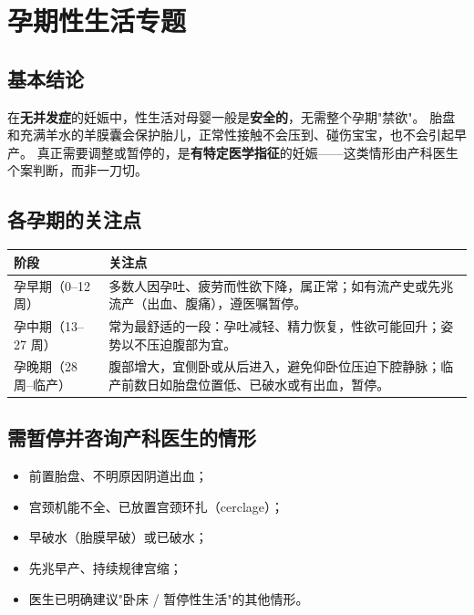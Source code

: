 
\chapter{孕期性生活专题}

\section{基本结论}
在\textbf{无并发症}的妊娠中，性生活对母婴一般是\textbf{安全的}，无需整个孕期"禁欲"。
胎盘和充满羊水的羊膜囊会保护胎儿，正常性接触不会压到、碰伤宝宝，也不会引起早产。
真正需要调整或暂停的，是\textbf{有特定医学指征}的妊娠——这类情形由产科医生个案判断，而非一刀切。

\section{各孕期的关注点}
\begin{tabularx}{\textwidth}{l X}
\toprule
\textbf{阶段} & \textbf{关注点} \\
\midrule
孕早期（0--12 周） & 多数人因孕吐、疲劳而性欲下降，属正常；如有流产史或先兆流产（出血、腹痛），遵医嘱暂停。 \\
孕中期（13--27 周） & 常为最舒适的一段：孕吐减轻、精力恢复，性欲可能回升；姿势以不压迫腹部为宜。 \\
孕晚期（28 周--临产） & 腹部增大，宜侧卧或从后进入，避免仰卧位压迫下腔静脉；临产前数日如胎盘位置低、已破水或有出血，暂停。 \\
\bottomrule
\end{tabularx}

\section{需暂停并咨询产科医生的情形}
\begin{itemize}
  \item 前置胎盘、不明原因阴道出血；
  \item 宫颈机能不全、已放置宫颈环扎（cerclage）；
  \item 早破水（胎膜早破）或已破水；
  \item 先兆早产、持续规律宫缩；
  \item 医生已明确建议"卧床 / 暂停性生活"的其他情形。
\end{itemize}

